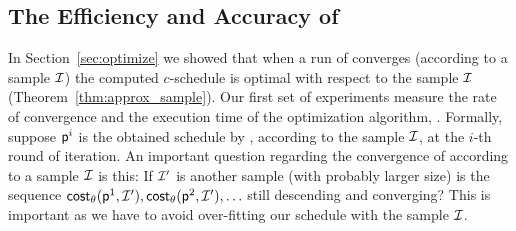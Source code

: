  
\begin{table}[ht]
\centering
{}
\caption{The datasets and corresponding statistics.}\label{table:datasets}
\end{table}







\subsection{The Efficiency and Accuracy of \algonameapx}
In Section~\ref{sec:optimize}  we showed that when a run of \algonameapx converges
(according to a sample $\mathcal{I}$) the computed $c$-schedule is optimal with
respect to the sample $\mathcal{I}$ (Theorem~\ref{thm:approx_sample}). Our first set
of experiments measure the rate of convergence and the execution time of the
optimization algorithm, \algonameapx. Formally, 
suppose $\mathsf{p}^i$ is the obtained schedule by \algonameapx, according to the
sample $\mathcal{I}$, at the $i$-th round of iteration. An important question
regarding the  convergence of \algonameapx according to a sample $\mathcal{I}$ is this: If $\mathcal{I}'$ is another sample (with probably larger size) is the sequence $\mathsf{cost}_\theta(\mathsf{p}^1,\mathcal{I}'),\mathsf{cost}_\theta(\mathsf{p}^2,\mathcal{I}'),\ldots$ still descending and converging? This is important as we have to  avoid over-fitting our schedule with the sample $\mathcal{I}$.


